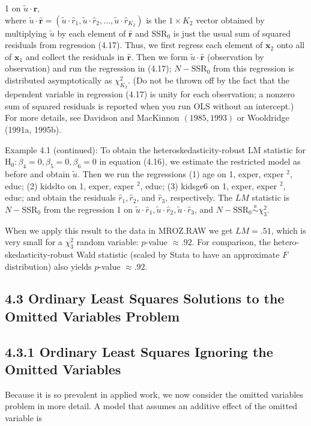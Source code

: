 \documentclass[10pt]{article}
\begin{document}
1 on $\tilde{u} \cdot \hat{\mathbf{r}}$,\\
where $\tilde{u} \cdot \hat{\mathbf{r}}=\left(\tilde{u} \cdot \hat{r}_{1}, \tilde{u} \cdot \hat{r}_{2}, \ldots, \tilde{u} \cdot \hat{r}_{K_{2}}\right)$ is the $1 \times K_{2}$ vector obtained by multiplying $\tilde{u}$ by each element of $\hat{\mathbf{r}}$ and $\mathrm{SSR}_{0}$ is just the usual sum of squared residuals from regression (4.17). Thus, we first regress each element of $\mathbf{x}_{2}$ onto all of $\mathbf{x}_{1}$ and collect the residuals in $\hat{\mathbf{r}}$. Then we form $\tilde{u} \cdot \hat{\mathbf{r}}$ (observation by observation) and run the regression in (4.17); $N-\mathrm{SSR}_{0}$ from this regression is distributed asymptotically as $\chi_{K_{2}}^{2}$. (Do not be thrown off by the fact that the dependent variable in regression (4.17) is unity for each observation; a nonzero sum of squared residuals is reported when you run OLS without an intercept.) For more details, see Davidson and MacKinnon $(1985,1993)$ or Wooldridge (1991a, 1995b).

Example 4.1 (continued): To obtain the heteroskedasticity-robust LM statistic for $\mathrm{H}_{0}: \beta_{4}=0, \beta_{5}=0, \beta_{6}=0$ in equation (4.16), we estimate the restricted model as before and obtain $\tilde{u}$. Then we run the regressions (1) age on 1, exper, exper ${ }^{2}$, educ; (2) kidslto on 1, exper, exper ${ }^{2}$, educ; (3) kidsge6 on 1, exper, exper ${ }^{2}$, educ; and obtain the residuals $\hat{r}_{1}, \hat{r}_{2}$, and $\hat{r}_{3}$, respectively. The $L M$ statistic is $N-\mathrm{SSR}_{0}$ from the regression 1 on $\tilde{u} \cdot \hat{r}_{1}, \tilde{u} \cdot \hat{r}_{2}, \tilde{u} \cdot \hat{r}_{3}$, and $N-\mathrm{SSR}_{0} \stackrel{a}{\sim} \chi_{3}^{2}$.

When we apply this result to the data in MROZ.RAW we get $L M=.51$, which is very small for a $\chi_{3}^{2}$ random variable: $p$-value $\approx .92$. For comparison, the hetero-skedasticity-robust Wald statistic (scaled by Stata to have an approximate $F$ distribution) also yields $p$-value $\approx .92$.

\subsection*{4.3 Ordinary Least Squares Solutions to the Omitted Variables Problem}
\subsection*{4.3.1 Ordinary Least Squares Ignoring the Omitted Variables}
Because it is so prevalent in applied work, we now consider the omitted variables problem in more detail. A model that assumes an additive effect of the omitted variable is
\end{document}
